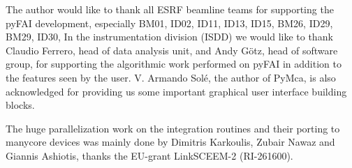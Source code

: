 \documentclass[preprint]{iucr}
\begin{document}
The author would like to thank all ESRF beamline teams for supporting the pyFAI
development, especially BM01, ID02, ID11, ID13, ID15, BM26, ID29, BM29, ID30,
In the instrumentation division (ISDD) we would like to thank Claudio Ferrero,
head of data analysis unit, and Andy G\"otz, head of software group, for
supporting the algorithmic work performed on pyFAI in addition to the features
seen by the user.
V. Armando Solé, the author of PyMca, is also acknowledged for providing us some
important graphical user interface building blocks.
  
The huge parallelization work on the integration routines and their porting to
manycore devices was mainly done by Dimitris Karkoulis, Zubair Nawaz and Giannis Ashiotis,
thanks the EU-grant LinkSCEEM-2 (RI-261600).
\end{document}
